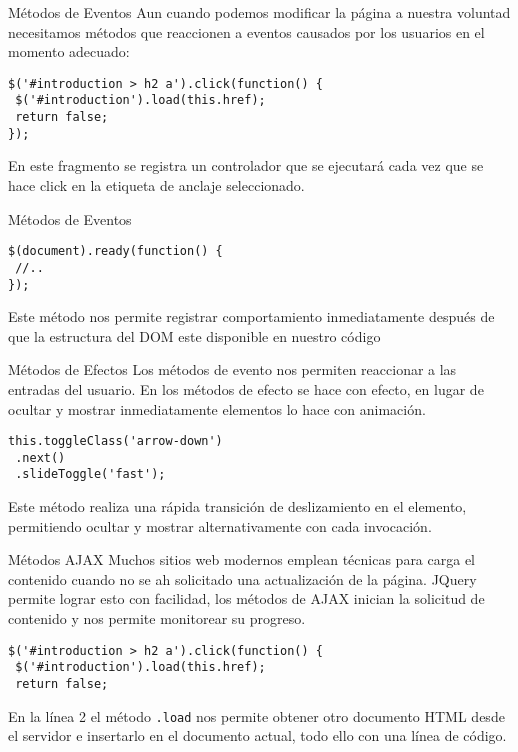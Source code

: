 \begin{frame}[fragile]{Métodos de Eventos} %
    Aun cuando podemos modificar la página a nuestra voluntad necesitamos
    métodos que reaccionen a eventos causados por los usuarios en el momento
    adecuado:
\begin{lstlisting}
$('#introduction > h2 a').click(function() {
 $('#introduction').load(this.href);
 return false;
});
\end{lstlisting}
    En este fragmento se registra un controlador que se ejecutará cada vez que
    se hace click en la etiqueta de anclaje seleccionado.
\end{frame}

\begin{frame}[fragile]{Métodos de Eventos} %
\begin{lstlisting}
$(document).ready(function() {
 //..
});
\end{lstlisting}
    Este método nos permite registrar comportamiento inmediatamente después de
    que la estructura del DOM este disponible en nuestro código
\end{frame}

\begin{frame}[fragile]{Métodos de Efectos} %
    Los métodos de evento nos permiten reaccionar a las entradas del usuario.
    En los métodos de efecto se hace con efecto, en lugar de ocultar y mostrar
    inmediatamente elementos lo hace con animación.
\begin{lstlisting}
this.toggleClass('arrow-down')
 .next()
 .slideToggle('fast');
\end{lstlisting}
    Este método realiza una rápida transición de deslizamiento en el elemento,
    permitiendo ocultar y mostrar alternativamente con cada invocación.
\end{frame}

\begin{frame}[fragile]{Métodos AJAX} %
    Muchos sitios web modernos emplean técnicas para carga el contenido cuando
    no se ah solicitado una actualización de la página. JQuery permite lograr
    esto con facilidad, los métodos de AJAX inician la solicitud de contenido y
    nos permite monitorear su progreso.
\begin{lstlisting}
$('#introduction > h2 a').click(function() {
 $('#introduction').load(this.href);
 return false;
\end{lstlisting}
    En la línea 2 el método \texttt{.load} nos permite obtener otro documento HTML
    desde el servidor e insertarlo en el documento actual,  todo ello con una
    línea de código.
\end{frame}

